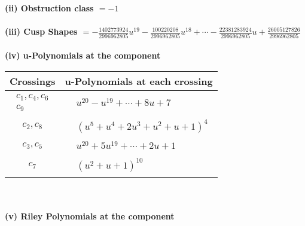 \documentclass[1p]{elsarticle_modified}
\theoremstyle{definition}
\begin{document}
\flushleft \textbf{(ii) Obstruction class $= -1$}\\~\\
\flushleft \textbf{(iii) Cusp Shapes $= -\frac{1402773924}{2996962805} u^{19}-\frac{100220208}{2996962805} u^{18}+\cdots-\frac{22381283924}{2996962805} u+\frac{26005127826}{2996962805}$}\\~\\
\newpage\renewcommand{\arraystretch}{1}
\flushleft \textbf{(iv) u-Polynomials at the component}\newline \\
\begin{tabular}{m{50pt}|m{274pt}}
Crossings & \hspace{64pt}u-Polynomials at each crossing \\
\hline $$\begin{aligned}c_{1},c_{4},c_{6}\\c_{9}\end{aligned}$$&$\begin{aligned}
&u^{20}- u^{19}+\cdots+8 u+7
\end{aligned}$\\
\hline $$\begin{aligned}c_{2},c_{8}\end{aligned}$$&$\begin{aligned}
&(u^5+u^4+2 u^3+u^2+u+1)^4
\end{aligned}$\\
\hline $$\begin{aligned}c_{3},c_{5}\end{aligned}$$&$\begin{aligned}
&u^{20}+5 u^{19}+\cdots+2 u+1
\end{aligned}$\\
\hline $$\begin{aligned}c_{7}\end{aligned}$$&$\begin{aligned}
&(u^2+u+1)^{10}
\end{aligned}$\\
\hline
\end{tabular}\\~\\
\newpage\renewcommand{\arraystretch}{1}
\flushleft \textbf{(v) Riley Polynomials at the component}\newline \\
\end{document}
